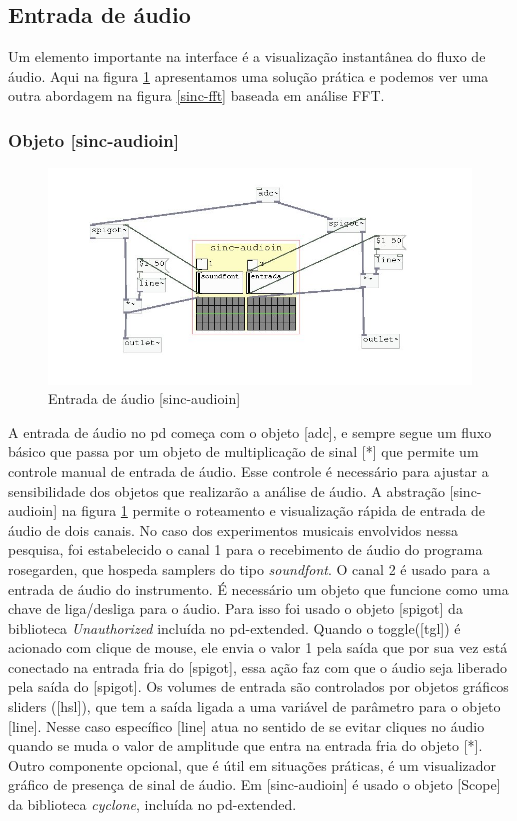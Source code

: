 \documentclass{ppgmus}
\begin{document}
\subsection{Entrada de áudio}

Um elemento importante na interface é a visualização instantânea
do fluxo de áudio. Aqui na figura \ref{audioin} apresentamos uma solução prática e podemos
ver uma outra abordagem na figura \ref{sinc-fft} baseada em análise FFT.

\subsubsection{Objeto [sinc-audioin]}


\begin{figure}
\includegraphics[scale=.55]{audioin}
\caption{Entrada de áudio [sinc-audioin]}
\label{audioin}
\end{figure}

A entrada de áudio no pd começa com o objeto  [adc\texttildelow], e sempre segue um fluxo
básico que passa por um objeto de multiplicação de sinal [*\texttildelow] que permite um
controle manual de entrada de áudio. Esse controle é necessário para ajustar 
a sensibilidade dos objetos que realizarão a análise de áudio. A abstração 
[sinc-audioin] na figura \ref{audioin} permite o roteamento e visualização rápida 
de entrada de áudio de dois canais. No caso dos experimentos musicais envolvidos 
nessa pesquisa, foi estabelecido o canal 1 para o recebimento de áudio do programa 
rosegarden, que hospeda samplers do tipo \textit{soundfont}. O canal 2 é usado para 
a entrada de áudio do instrumento. É necessário um objeto que funcione como uma chave de
liga/desliga para o áudio. Para isso foi usado o objeto [spigot\texttildelow] da biblioteca
\textit{Unauthorized} incluída no pd-extended.
 Quando o toggle([tgl]) é acionado com clique de mouse,
ele envia o valor 1 pela saída que por sua vez está conectado na entrada fria do
[spigot\texttildelow], essa ação faz com que o áudio seja liberado pela saída do [spigot\texttildelow].
Os volumes de entrada são controlados por objetos gráficos sliders ([hsl]), que tem
a saída ligada a uma variável de parâmetro para o objeto [line\texttildelow]. Nesse caso específico
[line\texttildelow] atua no sentido de se evitar cliques no áudio quando se muda o valor de 
amplitude que entra na entrada fria do objeto [*\texttildelow]. Outro componente
opcional, que é útil em situações práticas, é um visualizador gráfico de presença de sinal
de áudio. Em [sinc-audioin] é usado o objeto [Scope\texttildelow] da biblioteca \textit{cyclone}, 
incluída no pd-extended.
\end{document}
